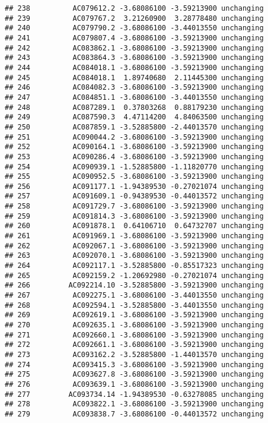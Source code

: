 \documentclass[]{article}
\begin{document}
\begin{verbatim}
## 238          AC079612.2 -3.68086100 -3.59213900 unchanging
## 239          AC079767.2  3.21260900  3.28778480 unchanging
## 240          AC079790.2 -3.68086100 -3.44013550 unchanging
## 241          AC079807.4 -3.68086100 -3.59213900 unchanging
## 242          AC083862.1 -3.68086100 -3.59213900 unchanging
## 243          AC083864.3 -3.68086100 -3.59213900 unchanging
## 244          AC084018.1 -3.68086100 -3.59213900 unchanging
## 245          AC084018.1  1.89740680  2.11445300 unchanging
## 246          AC084082.3 -3.68086100 -3.59213900 unchanging
## 247          AC084851.1 -3.68086100 -3.44013550 unchanging
## 248          AC087289.1  0.37803268  0.88179230 unchanging
## 249          AC087590.3  4.47114200  4.84063500 unchanging
## 250          AC087859.1 -3.52885800 -2.44013570 unchanging
## 251          AC090044.2 -3.68086100 -3.59213900 unchanging
## 252          AC090164.1 -3.68086100 -3.59213900 unchanging
## 253          AC090286.4 -3.68086100 -3.59213900 unchanging
## 254          AC090939.1 -1.52885800 -1.11820770 unchanging
## 255          AC090952.5 -3.68086100 -3.59213900 unchanging
## 256          AC091177.1 -1.94389530 -0.27021074 unchanging
## 257          AC091609.1 -0.94389530 -0.44013572 unchanging
## 258          AC091729.7 -3.68086100 -3.59213900 unchanging
## 259          AC091814.3 -3.68086100 -3.59213900 unchanging
## 260          AC091878.1  0.64106710  0.64732707 unchanging
## 261          AC091969.1 -3.68086100 -3.59213900 unchanging
## 262          AC092067.1 -3.68086100 -3.59213900 unchanging
## 263          AC092070.1 -3.68086100 -3.59213900 unchanging
## 264          AC092117.1 -3.52885800 -0.85517323 unchanging
## 265          AC092159.2 -1.20692980 -0.27021074 unchanging
## 266         AC092214.10 -3.52885800 -3.59213900 unchanging
## 267          AC092275.1 -3.68086100 -3.44013550 unchanging
## 268          AC092594.1 -3.52885800 -3.44013550 unchanging
## 269          AC092619.1 -3.68086100 -3.59213900 unchanging
## 270          AC092635.1 -3.68086100 -3.59213900 unchanging
## 271          AC092660.1 -3.68086100 -3.59213900 unchanging
## 272          AC092661.1 -3.68086100 -3.59213900 unchanging
## 273          AC093162.2 -3.52885800 -1.44013570 unchanging
## 274          AC093415.3 -3.68086100 -3.59213900 unchanging
## 275          AC093627.8 -3.68086100 -3.59213900 unchanging
## 276          AC093639.1 -3.68086100 -3.59213900 unchanging
## 277         AC093734.14 -1.94389530 -0.63278085 unchanging
## 278          AC093822.1 -3.68086100 -3.59213900 unchanging
## 279          AC093838.7 -3.68086100 -0.44013572 unchanging

\end{verbatim}
\end{document}
